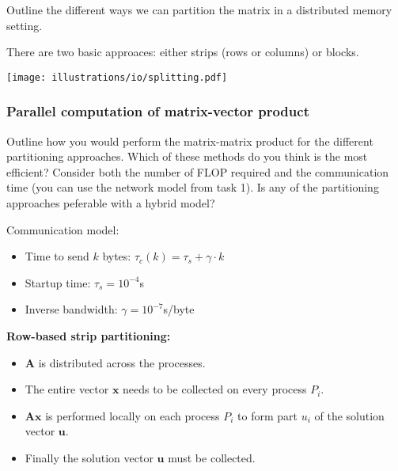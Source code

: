 \begin{question}
  Outline the different ways we can partition the matrix in a distributed memory setting.
\end{question}

\noindent There are two basic approaces: either strips (rows or columns) or blocks.

\begin{center}
  \texttt{[image: illustrations/io/splitting.pdf]}
\end{center}


\subsubsection{Parallel computation of matrix-vector product} %
\label{ssub:parallel_computation_of_matrix_vector_product}


\begin{question}
  Outline how you would perform the matrix-matrix product for the different partitioning approaches. Which of these methods do you think is the most efficient? Consider both the number of FLOP required and the communication time (you can use the network model from task 1). Is any of the partitioning approaches peferable with a hybrid model?

  \noindent Communication model:
  \begin{itemize} \itemsep=0em
    \item Time to send $k$ bytes: $\tau_c(k) = \tau_s + \gamma \cdot k$
    \item Startup time: $\tau_s = 10^{-4}$s
    \item Inverse bandwidth: $\gamma = 10^{-7}$s/byte
  \end{itemize}

\end{question}

\noindent\textbf{Row-based strip partitioning:}

\begin{itemize}
  \item $\mathbf{A}$ is distributed across the processes.
  \item The entire vector $\mathbf{x}$ needs to be collected on every process $P_i$.
  \item $\mathbf{Ax}$ is performed locally on each process $P_i$ to form part $u_i$ of the solution vector $\mathbf{u}$.
  \item Finally the solution vector $\mathbf{u}$ must be collected.
\end{itemize}

